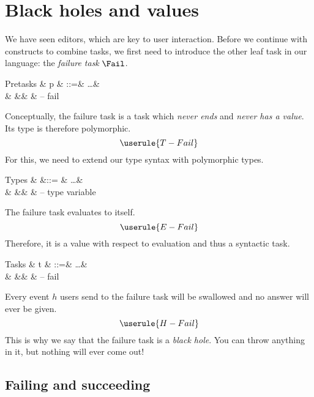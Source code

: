 
\section{Black holes and values}

We have seen editors,
which are key to user interaction.
Before we continue with constructs to combine tasks,
we first need to introduce the other leaf task in our language:
the \emph{failure task} $\Fail$.

\begin{grammar}
  Pretasks
    & p & ::=& \ldots & \\
    &   &\mid& \Fail  & – fail \\
\end{grammar}
Conceptually,
the failure task is a task which \emph{never ends} and \emph{never has a value}.
Its type is therefore polymorphic.
\begin{equation*}
  \userule{T-Fail}
\end{equation*}
For this,
we need to extend our type syntax with polymorphic types.
\begin{grammar}
  Types
    & \tau &::= & \ldots             & \\
    &      &\mid& \alpha             & – type variable \\
\end{grammar}

The failure task evaluates to itself.
\begin{equation*}
  \userule{E-Fail}
\end{equation*}
Therefore,
it is a value with respect to evaluation and thus a syntactic task.
\begin{grammar}
  Tasks
    & t & ::=& \ldots & \\
    &   &\mid& \Fail  & – fail \\
\end{grammar}

Every event $h$ users send to the failure task will be swallowed
and no answer will ever be given.
\begin{equation*}
  \userule{H-Fail}
\end{equation*}
This is why we say that the failure task is a \emph{black hole}.
You can throw anything in it,
but nothing will ever come out!


\subsection{Failing and succeeding}
\label{sec:failing}


